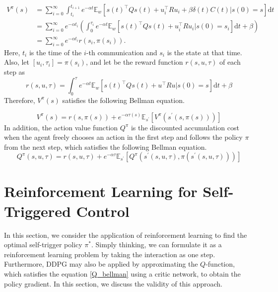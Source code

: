 \documentclass[english, dvipdfmx]{ampmt}             %
\newcommand{\expect}{\mathbb{E}}
\begin{document}
\begin{align}
	V^{\pi}(s) &= \sum_{i=0}^{\infty}\int_{t_i}^{t_{i+1}} e^{-\alpha t}\expect_{w}[s(t)^{\top}Qs(t)+u_i^{\top}Ru_i+\beta \delta(t)C(t)|s(0)=s]\textrm{d}t \nonumber \\
			 &= \sum_{i=0}^{\infty} e^{-\alpha t_i} \left(\int_{0}^{\tau_i}e^{-\alpha t}\expect_{w}[s(t)^{\top}Qs(t)+u_i^{\top}Ru_i|s(0)=s_i]\textrm{d}t + \beta\right) \nonumber \\
			 &= \sum_{i=0}^{\infty} e^{-\alpha t_i} r(s_i, \pi(s_i)) \label{self_acc_reward}.
\end{align}
Here, $t_i$ is the time of the $i$-th communication and $s_i$ is the state at that time. Also, let $[u_i, \tau_i]=\pi(s_i)$, and let be the reward function $r(s, u, \tau)$ of each step as
\begin{equation}
	r(s, u, \tau) = \int_{0}^{\tau}e^{-\alpha t}\expect_{w}[s(t)^{\top}Qs(t)+u^{\top}Ru|s(0)=s]\textrm{d}t + \beta
\end{equation}
Therefore, $V^{\pi}(s)$ satisfies the following Bellman equation. \par
\begin{equation}
	V^{\pi}(s) = r(s,\pi(s)) + e^{-\alpha\tau(s)}\expect_{s^{\prime}}[V^{\pi}(s^{\prime}(s,\pi(s)))] \label{bellman}
\end{equation}
In addition, the action value function $Q^{\pi}$ is the discounted accumulation cost when the agent freely chooses an action in the first step and follows the policy $\pi$ from the next step, which satisfies the following Bellman equation.
\begin{equation}
	Q^{\pi}(s,u,\tau) = r(s,u,\tau) + e^{-\alpha\tau}\expect_{s^{\prime}}[Q^{\pi}(s^{\prime}(s,u,\tau), \pi(s^{\prime}(s,u,\tau)))] \label{Q_bellman}
\end{equation}

\section{Reinforcement Learning for Self-Triggered Control}
In this section, we consider the application of reinforcement learning to find the optimal self-trigger policy $\pi^{*}$. Simply thinking, we can formulate it as a reinforcement learning problem by taking the interaction as one step. Furthermore, DDPG may also be applied by approximating the $Q$-function, which satisfies the equation \eqref{Q_bellman} using a critic network, to obtain the policy gradient. In this section, we discuss the validity of this approach.
\end{document}
